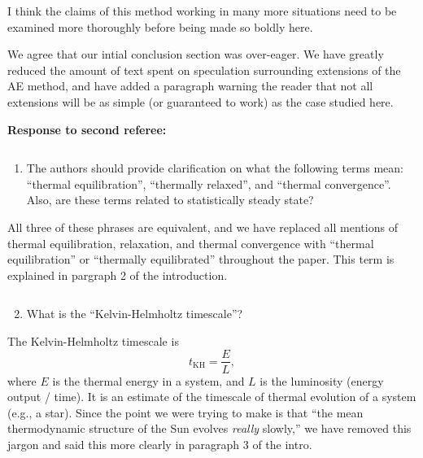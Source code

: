 \documentclass[aps, 11pt, singlecolumn]{revtex4-1} %
\begin{document}
\begin{singlespace}
\begin{myquotation}
I think the claims of this method working in many more situations need
to be examined more thoroughly before being made so boldly here.
\end{myquotation}
We agree that our intial conclusion section was over-eager. We have 
greatly reduced the amount of text spent on speculation surrounding
extensions of the AE method, and have added a paragraph warning the
reader that not all extensions will be as simple (or guaranteed to work)
as the case studied here.

\newpage
\noindent
\Large{\textbf{Response to second referee:}}\newline$\,$\newline\indent
\begin{myquotation}
$\,$\\\vspace{-1.25cm}
\begin{enumerate}
\item The authors should provide clarification on what the following terms mean: ``thermal equilibration'', ``thermally relaxed'', and ``thermal convergence''. Also, are these terms related to statistically steady state?
\end{enumerate}
\end{myquotation}
All three of these phrases are equivalent, and we have replaced all mentions of
thermal equilibration, relaxation, and thermal convergence with ``thermal
equilibration'' or ``thermally equilibrated'' throughout the paper. This term
is explained in pargraph 2 of the introduction.
\begin{myquotation}
$\,$\\\vspace{-1.25cm}
\begin{enumerate}
\setcounter{enumi}{1}
\item What is the ``Kelvin-Helmholtz timescale''?
\end{enumerate}
\end{myquotation}
The Kelvin-Helmholtz timescale is 
$$
t_{\text{KH}} = \frac{E}{L},
$$
where $E$ is the thermal energy in a system, and $L$ is the luminosity
(energy output / time). It is an estimate of the timescale
of thermal evolution of a system 
(e.g., a star). Since the point we were trying to make is that ``the mean 
thermodynamic structure of the Sun evolves \emph{really} slowly,''
we have removed this jargon and said this more clearly in paragraph 3 of the intro.


\end{singlespace}
\end{document}
